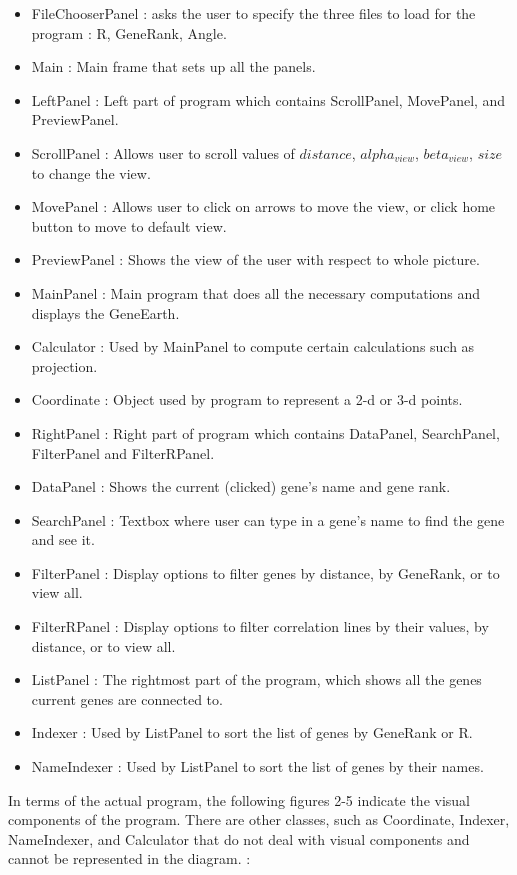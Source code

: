 \documentclass[]{article}
\begin{document}
\begin{itemize}
\item FileChooserPanel : asks the user to specify the three files to load for the program : R, GeneRank, Angle.
\item Main : Main frame that sets up all the panels.
\item LeftPanel : Left part of program which contains ScrollPanel, MovePanel, and PreviewPanel.
\item ScrollPanel : Allows user to scroll values of $distance$, $alpha_{view}$, $beta_{view}$, $size$ to change the view.
\item MovePanel : Allows user to click on arrows to move the view, or click home button to move to default view.
\item PreviewPanel : Shows the view of the user with respect to whole picture.
\item MainPanel : Main program that does all the necessary computations and displays the GeneEarth.
\item Calculator : Used by MainPanel to compute certain calculations such as projection.
\item Coordinate : Object used by program to represent a 2-d or 3-d points.
\item RightPanel : Right part of program which contains DataPanel, SearchPanel, FilterPanel and FilterRPanel.
\item DataPanel : Shows the current (clicked) gene's name and gene rank.
\item SearchPanel : Textbox where user can type in a gene's name to find the gene and see it.
\item FilterPanel : Display options to filter genes by distance, by GeneRank, or to view all.
\item FilterRPanel : Display options to filter correlation lines by their values, by distance, or to view all.
\item ListPanel : The rightmost part of the program, which shows all the genes current genes are connected to.
\item Indexer : Used by ListPanel to sort the list of genes by GeneRank or R.
\item NameIndexer : Used by ListPanel to sort the list of genes by their names.


\end{itemize}

\doublespacing
\bigskip
In terms of the actual program, the following figures 2-5 indicate the visual components of the program. There are other classes, such as Coordinate, Indexer, NameIndexer, and Calculator that do not deal with visual components and cannot be represented in the diagram. : 
\end{document}
